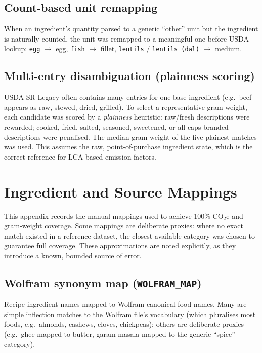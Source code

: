 \documentclass{article}
\begin{document}
\subsection{Count-based unit remapping}

When an ingredient's quantity parsed to a generic ``other'' unit but the ingredient is naturally counted, the unit was remapped to a meaningful one before USDA lookup: \texttt{egg} $\rightarrow$ egg, \texttt{fish} $\rightarrow$ fillet, \texttt{lentils} / \texttt{lentils (dal)} $\rightarrow$ medium.

\subsection{Multi-entry disambiguation (plainness scoring)}

USDA SR Legacy often contains many entries for one base ingredient (e.g.\ beef appears as raw, stewed, dried, grilled). To select a representative gram weight, each candidate was scored by a \emph{plainness} heuristic: raw/fresh descriptions were rewarded; cooked, fried, salted, seasoned, sweetened, or all-caps-branded descriptions were penalised. The median gram weight of the five plainest matches was used. This assumes the raw, point-of-purchase ingredient state, which is the correct reference for LCA-based emission factors.

\section{Ingredient and Source Mappings}
\label{app:mappings}

This appendix records the manual mappings used to achieve 100\% CO$_2$e and gram-weight coverage. Some mappings are deliberate proxies: where no exact match existed in a reference dataset, the closest available category was chosen to guarantee full coverage. These approximations are noted explicitly, as they introduce a known, bounded source of error.

\subsection{Wolfram synonym map (\texttt{WOLFRAM\_MAP})}

Recipe ingredient names mapped to Wolfram canonical food names. Many are simple inflection matches to the Wolfram file's vocabulary (which pluralises most foods, e.g.\ almonds, cashews, cloves, chickpeas); others are deliberate proxies (e.g.\ ghee mapped to butter, garam masala mapped to the generic ``spice'' category).
\end{document}
